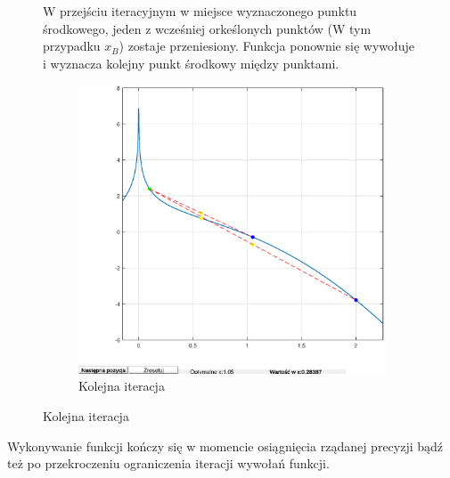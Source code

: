 \documentclass{article}
\begin{document}
\begin{figure}[H]
    \begin{multicols}{2}
        \null \vfill
        W przejściu iteracyjnym w miejsce wyznaczonego punktu środkowego, jeden z wcześniej orkeślonych punktów (W tym przypadku $x_B$) zostaje przeniesiony. Funkcja ponownie się wywołuje i wyznacza kolejny punkt środkowy między punktami.
        \vfill \null
        \par
        \begin{figure}[H]
            \centering
            \includegraphics[width=\linewidth]{img/Bisection1.eps}
        \caption{Kolejna iteracja}
            \label{fig:my_label}
        \end{figure}
    \end{multicols}
\end{figure}
 Wykonywanie funkcji kończy się w momencie osiągnięcia rządanej precyzji bądź też po przekroczeniu ograniczenia iteracji wywołań funkcji.
\end{document}
